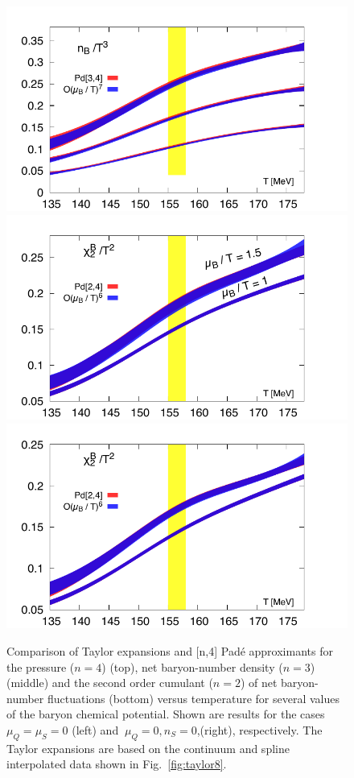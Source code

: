 \documentclass[pdflatex,prd,twocolumn,showpacs,superscriptaddress,nofootinbib]{revtex4-1}
\newcommand{\pade}{Pad\'e}
\begin{document}
\begin{figure}[t]
\begin{center}
\includegraphics[scale=0.59]{fig/Temp_BQS100_muB_Order_pd_r05.pdf}
\includegraphics[scale=0.59]{fig/Temp_BQS200_muB_Order_pd24.pdf}
\includegraphics[scale=0.59]{fig/Temp_BQS200_muB_Order_pd24_r05.pdf}
\end{center}
\caption{Comparison of Taylor expansions and [n,4] {\pade} approximants for the pressure ($n=4$) (top), net baryon-number density ($n=3$) (middle) and the second order cumulant ($n=2$) of net baryon-number fluctuations (bottom) versus temperature
for several values of the baryon chemical potential. 
Shown are results for the
cases $\mu_Q=\mu_S=0$ (left) and 
$\ \mu_Q=0,n_S=0$,(right), respectively.
The Taylor expansions are based on the continuum and spline interpolated data shown in Fig.~\ref{fig:taylor8}.
}
\label{fig:EoS2}
\end{figure}
\end{document}
